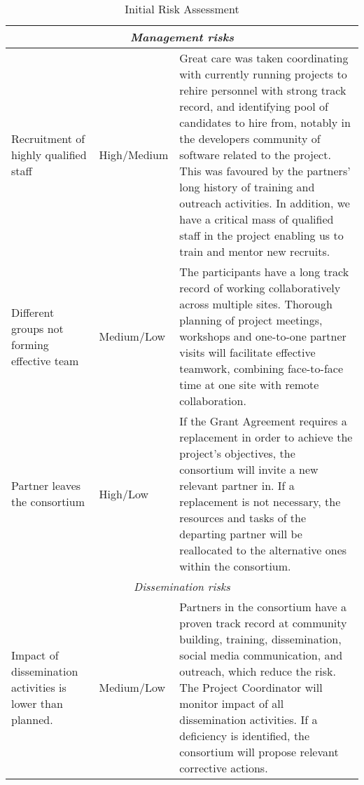 \begin{table}
\begin{center}
\begin{tabular}{|m{}|m{}|m{}|}
  \\\hline

%

  \multicolumn{3}{|c|}{
    \textit{Management risks}
  }
  \\\hline

  Recruitment of highly qualified staff & High/Medium &

  Great care was taken coordinating with currently running projects to
  rehire personnel with strong track record, and identifying pool of
  candidates to hire from, notably in the developers community of
  software related to the project. This was favoured by the partners'
  long history of training and outreach activities. In addition, we
  have a critical mass of qualified staff in the project enabling us
  to train and mentor new recruits.

 \\\hline

  Different groups not forming effective team & Medium/Low & The participants have a long
  track record of working collaboratively across multiple
  sites. Thorough planning of project meetings, workshops and
  one-to-one partner visits will facilitate effective teamwork,
  combining face-to-face time at one site with remote
  collaboration.\\\hline

  Partner leaves the consortium & High/Low & If the Grant Agreement requires a replacement
  in order to achieve the project's objectives, the consortium will invite a new
  relevant partner in. If a replacement is not necessary, the resources and tasks
  of the departing partner will be reallocated to the alternative ones within the
  consortium.
  \\\hline

  \multicolumn{3}{|c|}{
    \textit{Dissemination risks}
  }
  \\\hline

  Impact of dissemination activities is lower than planned. & Medium/Low &

  Partners in the consortium have a proven track record at community
  building, training, dissemination, social media communication, and
  outreach, which reduce the risk. The Project Coordinator
  will monitor impact of all dissemination activities. If a deficiency is identified, the consortium
  will propose relevant corrective actions.\\\hline

  \end{tabular}
\end{center}
\caption{\label{risk-table}Initial Risk Assessment}
\end{table}
\fi
